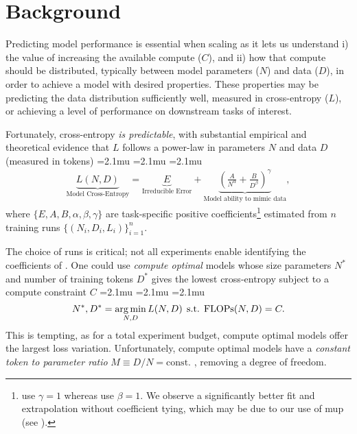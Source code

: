 \section{Background}
\label{sec:background}
Predicting model performance is essential when scaling
as it lets us understand i) the value of increasing the available compute ($C$),
and ii) how that compute should be distributed, typically between model parameters ($N$) and data ($D$), in order to achieve a model with desired properties.
These properties may be predicting the data distribution sufficiently well, measured in cross-entropy ($L$),
or achieving a level of performance on downstream tasks of interest.

Fortunately, cross-entropy \emph{is predictable}, with substantial empirical and theoretical
evidence that $L$ follows a power-law in parameters $N$ and data $D$ (measured in tokens)
{
		\medmuskip=2.1mu
		\thinmuskip=2.1mu
		\thickmuskip=2.1mu
\begin{align}
	\underbrace{L(N,D)}_\text{Model Cross-Entropy}=
	\underbrace{E}_{\text{Irreducible Error}}
	+
	\underbrace{\left(\frac{A}{N^\alpha}+\frac{B}{D^\beta}\right)^\gamma}_{\text{Model ability to mimic data}},
	\label{eq:supervised-scaling-law}
\end{align}
}where $\{E,A,B,\alpha,\beta,\gamma\}$ are task-specific positive coefficients\footnote{\citet{DBLP:journals/corr/abs-2203-15556} use $\gamma=1$
whereas \citet{DBLP:journals/corr/abs-2001-08361}
use $\beta=1$. We observe a significantly better fit and extrapolation without coefficient tying, which may be due to our use of \gls{mup} (see ).} estimated from $n$ training runs $\{(N_i,D_i,L_i)\}_{i=1}^n$.

The choice of runs is critical; not all experiments enable identifying
the coefficients of .
One could use \emph{compute optimal} models whose size parameters $N^*$
and number of training tokens $D^*$ gives the lowest cross-entropy subject to a compute constraint $C$
{
		\medmuskip=2.1mu
		\thinmuskip=2.1mu
		\thickmuskip=2.1mu
		\begin{equation}
			N^*,D^*=\operatorname*{arg\,min}_{N,D}L(N,D)\;\,\mathrm{s.t.}\;\,\mathrm{FLOPs}(N,D)=C.
		\end{equation}
	}This is tempting, as for a total experiment budget,
compute optimal models offer the largest loss variation.
Unfortunately, compute optimal models have a \emph{constant token to parameter ratio} $M\equiv D/N=\mathrm{const.}$  \citep{DBLP:journals/corr/abs-2203-15556},
removing a degree of freedom.

